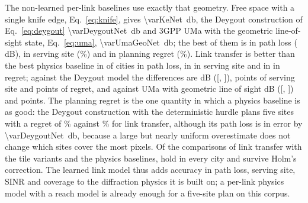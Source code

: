 The non-learned per-link baselines use exactly that geometry. Free space
with a single knife edge, Eq.~\eqref{eq:knife}, gives
\SI{\varKeNet}{\decibel}, the Deygout construction of Eq.~\eqref{eq:deygout}
\SI{\varDeygoutNet}{\decibel} and 3GPP UMa with the geometric
line-of-sight state, Eq.~\eqref{eq:uma}, \SI{\varUmaGeoNet}{\decibel}; the
best of them is \varBestPhysNetProse{} in path loss (\varBestPhysNetVal{}\,dB),
\varBestPhysAssocProse{} in serving site (\varBestPhysAssocVal\%) and
\varBestPhysRegretProse{} in planning regret (\varBestPhysRegretVal\%). Link
transfer is better than the best physics baseline in
\nLinkBetterPhysNet{} of \nVarFolds{} cities in path loss, in
\nLinkBetterPhysAssoc{} in serving site and in \nLinkBetterPhysRegret{} in
regret; against the Deygout model the differences are \dDecLinkDeygout{} dB
([\loDecLinkDeygout, \hiDecLinkDeygout]), \dDecLinkDeygoutAssoc{} points of
serving site and \dDecLinkDeygoutRegret{} points of regret, and against UMa
with geometric line of sight \dDecLinkUma{} dB ([\loDecLinkUma,
\hiDecLinkUma]) and \dDecLinkUmaAssoc{} points. The planning regret is the
one quantity in which a physics baseline is as good: the Deygout
construction with the deterministic hurdle plans five sites with a regret of
\varDeygoutRegret\% against \regretLink\% for link transfer, although its
path loss is in error by \SI{\varDeygoutNet}{\decibel}, because a large but
nearly uniform overestimate does not change which sites cover the most
pixels. Of the \nDecompLinkTotal{} comparisons of link transfer with the
tile variants and the physics baselines, \nDecompLinkAllCities{} hold in
every city and \nDecompLinkHolm{} survive Holm's correction. The learned
link model thus adds accuracy in path loss, serving site, SINR and coverage
to the diffraction physics it is built on; a per-link physics model with a
reach model is already enough for a five-site plan on this corpus.

\begin{table}[!tp]
\centering
\caption{Decomposition of the gap. Receiver-tile variants of the tile model
with exact labels, the source median and GBDT transfer, each without and with
the hurdle of the link model (+hurdle) and with a dual-slope
line-of-sight/obstructed label; non-learned per-link baselines with the
deterministic hurdle ``loss $\le$ cut-off''; and link transfer. Means over
the held-out cities; cens.: censored RMSE; reach: correctly predicted
reached/unreached pixels; cov.: coverage agreement at \SI{130}{\decibel};
regret: $K=5$.}
\label{tab:variants}
\footnotesize\setlength{\tabcolsep}{2.5pt}
%
\end{table}

